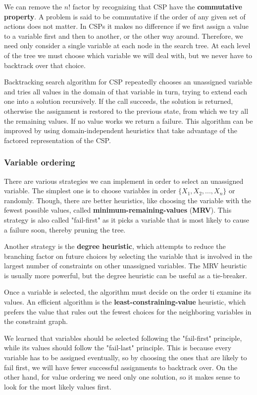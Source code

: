 \documentclass{article}
\begin{document}
We can remove the $n!$ factor by recognizing that CSP have the \textbf{commutative property}. A problem is said to be commutative if the order of any given set of actions does not matter. In CSPs it makes no difference if we first assign a value to a variable first and then to another, or the other way around. Therefore, we need only consider a single variable at each node in the search tree. At each level of the tree we must choose which variable we will deal with, but we never have to backtrack over that choice. 

Backtracking search algorithm for CSP repeatedly chooses an unassigned variable and tries all values in the domain of that variable in turn, trying to extend each one into a solution recursively. If the call succeeds, the solution is returned, otherwise the assignment is restored to the previous state, from which we try all the remaining values. If no value works we return a failure. This algorithm can be improved by using domain-independent heuristics that take advantage of the factored representation of the CSP.

\subsubsection{Variable ordering}
There are various strategies we can implement in order to select an unassigned variable. The simplest one is to choose variables in order $\{X_1, X_2, ..., X_n\}$ or randomly. Though, there are better heuristics, like choosing the variable with the fewest possible values, called \textbf{minimum-remaining-values} (\textbf{MRV}). This strategy is also called "fail-first" as it picks a variable that is most likely to cause a failure soon, thereby pruning the tree.

Another strategy is the \textbf{degree heuristic}, which attempts to reduce the branching factor on future choices by selecting the variable that is involved in the largest number of constraints on other unassigned variables. The MRV heuristic is usually more powerful, but the degree heuristic can be useful as a tie-breaker.

Once a variable is selected, the algorithm must decide on the order ti examine its values. An efficient algorithm is the \textbf{least-constraining-value} heuristic, which prefers the value that rules out the fewest choices for the neighboring variables in the constraint graph.

We learned that variables should be selected following the "fail-first" principle, while its values should follow the "fail-last" principle. This is because every variable has to be assigned eventually, so by choosing the ones that are likely to fail first, we will have fewer successful assignments to backtrack over. On the other hand, for value ordering we need only one solution, so it makes sense to look for the most likely values first.
\end{document}
